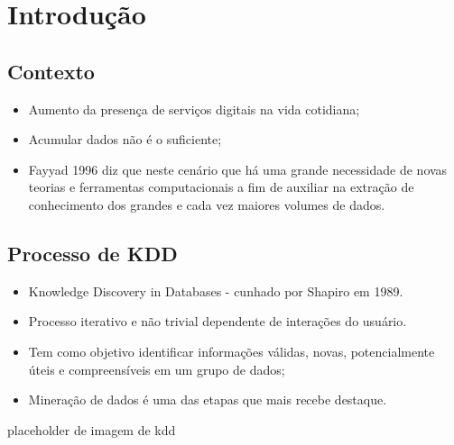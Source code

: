 \section{Introdução}

\subsection{Contexto}
\begin{frame}
	\begin{itemize}
		\item Aumento da presença de serviços digitais na vida cotidiana;
		\item Acumular dados não é o suficiente;
		\item Fayyad 1996 \cite{fayyad1996} diz que neste cenário que há uma grande necessidade de novas teorias e ferramentas computacionais a fim de auxiliar na extração de conhecimento dos grandes e cada vez maiores volumes de dados.
	\end{itemize}
\end{frame}

\subsection{Processo de KDD}

\begin{frame}
	\begin{itemize}
		\item Knowledge Discovery in Databases - cunhado por Shapiro em 1989.
		\item Processo iterativo e não trivial dependente de interações do usuário.
		\item Tem como objetivo identificar informações válidas, novas, potencialmente úteis e compreensíveis em um grupo de dados;
		\item Mineração de dados é uma das etapas que mais recebe destaque.
	\end{itemize}

placeholder de imagem de kdd
\end{frame}